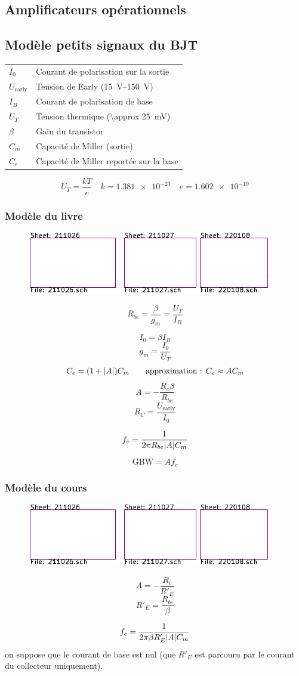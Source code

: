 \documentclass[resume]{subfiles}
\begin{document}
\begin{multicols}{3}
\section{Amplificateurs opérationnels}

\subsection{Modèle petits signaux du BJT}
\begin{center}
\begin{tabular}{ll}
$I_0$ & Courant de polarisation sur la sortie\\
$U_{\text{early}}$ & Tension de Early (\SIrange{15}{150}{\volt})\\
$I_B$ & Courant de polarisation de base\\
$U_T$ & Tension thermique (\SI{\approx 25}{\milli\volt})\\
$\beta$ & Gain du transistor\\
$C_m$ & Capacité de Miller (sortie)\\
$C_e$ & Capacité de Miller reportée sur la base
\end{tabular}
\end{center}
$$U_T=\frac{kT}{e}\quad k=\num{1.381e-23}\quad e=\num{1.602e-19}$$
\columnbreak
\subsubsection{Modèle du livre}
\begin{figure}[H]
\centering
\includegraphics[scale=1,page=9]{../KiCad/resume-crop.pdf}
\end{figure}


$$R_{be}=\frac{\beta}{g_m}=\frac{U_T}{I_B}$$

$$I_0=\beta I_B$$
$$g_m=\frac{I_0}{U_T}$$
$$C_e=(1+\abs{A})C_m\qquad \text{approximation : } C_e\approx AC_m$$
$$A=-\frac{R_c\beta}{R_{be}}$$
$$R_C=\frac{U_{\text{early}}}{I_0}$$


$$f_c=\frac{1}{2\pi R_{be} \abs{A} C_m}$$

$$\text{GBW}=Af_c$$
\subsubsection{Modèle du cours}
\begin{figure}[H]
\centering
\includegraphics[scale=1,page=10]{../KiCad/resume-crop.pdf}
\end{figure}
$$A=-\frac{R_c}{R'_E}$$
$$R'_E=\frac{R_{be}}{\beta}$$

$$f_c=\frac{1}{2\pi \beta R'_E \abs{A} C_m}$$
on suppose que le courant de base est nul (que $R'_E$ est parcouru par le courant du collecteur uniquement).
\end{multicols}
\end{document}
